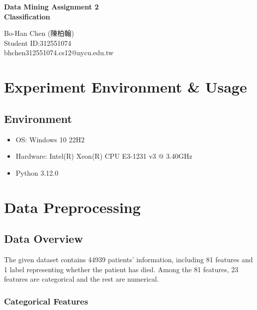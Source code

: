\documentclass[a4paper, oneside, final, 12pt]{scrartcl} %
\begin{document}


\begin{center}
    {\fontsize{18}{30}\textbf{Data Mining Assignment 2 \\ Classification}}
\end{center}

\begin{center}
  Bo-Han Chen (陳柏翰) \\
  Student ID:312551074 \\
  bhchen312551074.cs12@nycu.edu.tw
\end{center}

\section{Experiment Environment \& Usage}

\begingroup
\raggedright

\subsection{Environment}

\begin{itemize}
  \item OS: Windows 10 22H2
  \item Hardware: Intel(R) Xeon(R) CPU E3-1231 v3 @ 3.40GHz
  \item Python 3.12.0
\end{itemize}

\section{Data Preprocessing}

\subsection{Data Overview}

The given dataset contains 44939 patients' information, including 81 features and 1 label representing whether the patient has died.
Among the 81 features, 23 features are categorical and the rest are numerical.

\subsubsection{Categorical Features}
\end{document}
